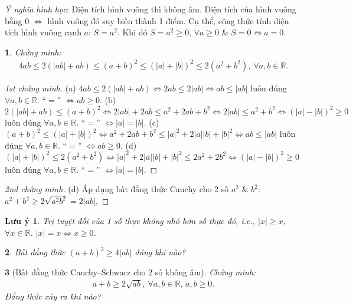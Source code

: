 \documentclass{article}
\newtheorem{baitoan}{}
\newtheorem{luuy}{Lưu ý}
\begin{document}
\textit{Ý nghĩa hình học}: Diện tích hình vuông thì không âm. Diện tích của hình vuông bằng 0 $\Leftrightarrow$ hình vuông đó suy biến thành 1 điểm. Cụ thể, công thức tính diện tích hình vuông cạnh $a$: $S = a^2$. Khi đó $S = a^2\ge0$, $\forall a\ge0$ \& $S = 0\Leftrightarrow a = 0$.

\begin{baitoan}
	Chứng minh:
	\begin{align}
		\label{1}
		4ab\le2(|ab| + ab)\le(a + b)^2\le(|a| + |b|)^2\le2(a^2 + b^2),\ \forall a,b\in\mathbb{R}.
	\end{align}
\end{baitoan}

\begin{proof}[1st chứng minh]
	(a) $4ab\le2(|ab| + ab)\Leftrightarrow2ab\le2|ab|\Leftrightarrow ab\le|ab|$ luôn đúng $\forall a,b\in\mathbb{R}$. ``$=$'' $\Leftrightarrow ab\ge0$. (b) $2(|ab| + ab)\le(a + b)^2\Leftrightarrow2|ab| + 2ab\le a^2 + 2ab + b^2\Leftrightarrow2|ab|\le a^2 + b^2\Leftrightarrow(|a| - |b|)^2\ge0$ luôn đúng $\forall a,b\in\mathbb{R}$. ``$=$'' $\Leftrightarrow|a| = |b|$. (c) $(a + b)^2\le(|a| + |b|)^2\Leftrightarrow a^2 + 2ab + b^2\le|a|^2 + 2|a||b| + |b|^2\Leftrightarrow ab\le|ab|$ luôn đúng $\forall a,b\in\mathbb{R}$. ``$=$'' $\Leftrightarrow ab\ge0$. (d) $(|a| + |b|)^2\le2(a^2 + b^2)\Leftrightarrow|a|^2 + 2|a||b| + |b|^2\le2a^2 + 2b^2\Leftrightarrow(|a| - |b|)^2\ge0$ luôn đúng $\forall a,b\in\mathbb{R}$. ``$=$'' $\Leftrightarrow|a| = |b|$.
\end{proof}

\begin{proof}[2nd chứng minh]
	(d) Áp dụng bất đẳng thức Cauchy cho 2 số $a^2$ \& $b^2$: $a^2 + b^2\ge2\sqrt{a^2b^2} = 2|ab|$, 
\end{proof}

\begin{luuy}
	Trị tuyệt đối của 1 số thực không nhỏ hơn số thực đó, i.e., $|x|\ge x$, $\forall x\in\mathbb{R}$. $|x| = x\Leftrightarrow x\ge0$.
\end{luuy}

\begin{baitoan}
	Bất đẳng thức $(a + b)^2\ge4|ab|$ đúng khi nào?
\end{baitoan}

\begin{baitoan}[Bất đẳng thức Cauchy--Schwarz cho 2 số không âm]
	Chứng minh:
	\begin{align*}
		\boxed{a + b\ge2\sqrt{ab},\ \forall a,b\in\mathbb{R},\,a,b\ge 0.}
	\end{align*}
	Đẳng thức xảy ra khi nào?
\end{baitoan}
\end{document}
